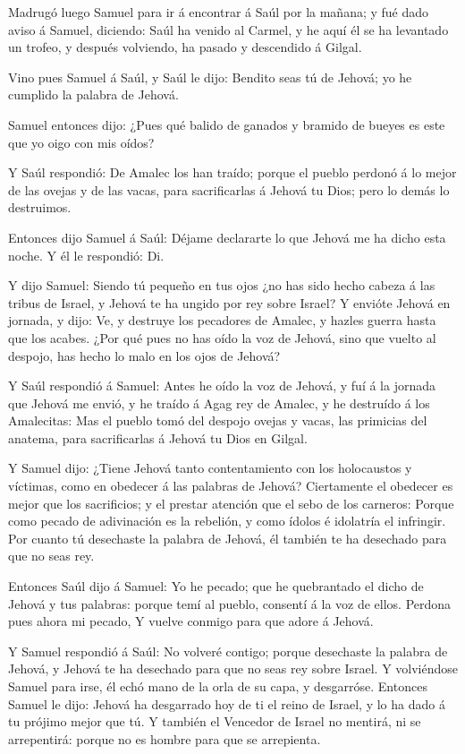  Madrugó luego Samuel para ir á encontrar á Saúl por la
mañana; y fué dado aviso á Samuel, diciendo: Saúl ha venido al Carmel, y
he aquí él se ha levantado un trofeo, y después volviendo, ha pasado y
descendido á Gilgal.

 Vino pues Samuel á Saúl, y Saúl le dijo: Bendito seas tú
de Jehová; yo he cumplido la palabra de Jehová.

 Samuel entonces dijo: ¿Pues qué balido de ganados y
bramido de bueyes es este que yo oigo con mis oídos?

 Y Saúl respondió: De Amalec los han traído; porque el
pueblo perdonó á lo mejor de las ovejas y de las vacas, para
sacrificarlas á Jehová tu Dios; pero lo demás lo destruimos.

 Entonces dijo Samuel á Saúl: Déjame declararte lo que
Jehová me ha dicho esta noche. Y él le respondió: Di.

 Y dijo Samuel: Siendo tú pequeño en tus ojos ¿no has
sido hecho cabeza á las tribus de Israel, y Jehová te ha ungido por rey
sobre Israel?  Y envióte Jehová en jornada, y dijo: Ve, y
destruye los pecadores de Amalec, y hazles guerra hasta que los acabes.
 ¿Por qué pues no has oído la voz de Jehová, sino que
vuelto al despojo, has hecho lo malo en los ojos de Jehová?

 Y Saúl respondió á Samuel: Antes he oído la voz de
Jehová, y fuí á la jornada que Jehová me envió, y he traído á Agag rey
de Amalec, y he destruído á los Amalecitas:  Mas el
pueblo tomó del despojo ovejas y vacas, las primicias del anatema, para
sacrificarlas á Jehová tu Dios en Gilgal.

 Y Samuel dijo: ¿Tiene Jehová tanto contentamiento con
los holocaustos y víctimas, como en obedecer á las palabras de Jehová?
Ciertamente el obedecer es mejor que los sacrificios; y el prestar
atención que el sebo de los carneros:  Porque como pecado
de adivinación es la rebelión, y como ídolos é idolatría el infringir.
Por cuanto tú desechaste la palabra de Jehová, él también te ha
desechado para que no seas rey.

 Entonces Saúl dijo á Samuel: Yo he pecado; que he
quebrantado el dicho de Jehová y tus palabras: porque temí al pueblo,
consentí á la voz de ellos. Perdona pues ahora mi pecado,
 Y vuelve conmigo para que adore á Jehová.

 Y Samuel respondió á Saúl: No volveré contigo; porque
desechaste la palabra de Jehová, y Jehová te ha desechado para que no
seas rey sobre Israel.  Y volviéndose Samuel para irse,
él echó mano de la orla de su capa, y desgarróse. 
Entonces Samuel le dijo: Jehová ha desgarrado hoy de ti el reino de
Israel, y lo ha dado á tu prójimo mejor que tú.  Y
también el Vencedor de Israel no mentirá, ni se arrepentirá: porque no
es hombre para que se arrepienta.

